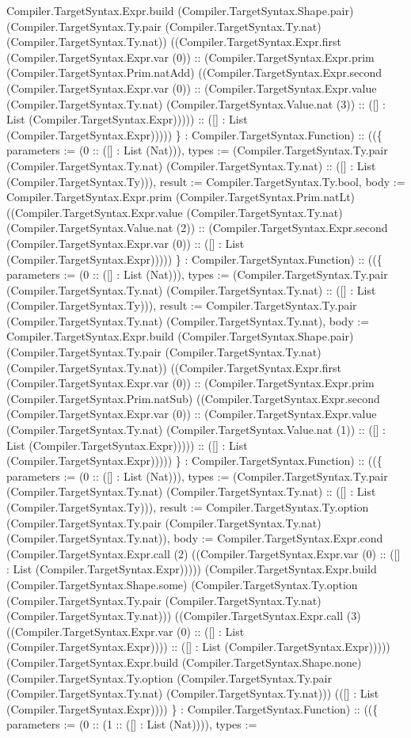 \documentclass[11pt]{article}
\begin{document}
Compiler.TargetSyntax.Expr.build (Compiler.TargetSyntax.Shape.pair) (Compiler.TargetSyntax.Ty.pair (Compiler.TargetSyntax.Ty.nat) (Compiler.TargetSyntax.Ty.nat)) ((Compiler.TargetSyntax.Expr.first (Compiler.TargetSyntax.Expr.var (0)) :: (Compiler.TargetSyntax.Expr.prim (Compiler.TargetSyntax.Prim.natAdd) ((Compiler.TargetSyntax.Expr.second (Compiler.TargetSyntax.Expr.var (0)) :: (Compiler.TargetSyntax.Expr.value (Compiler.TargetSyntax.Ty.nat) (Compiler.TargetSyntax.Value.nat (3)) :: ([] : List (Compiler.TargetSyntax.Expr))))) :: ([] : List (Compiler.TargetSyntax.Expr))))) \} : Compiler.TargetSyntax.Function) :: ((\{ parameters := (0 :: ([] : List (Nat))), types := (Compiler.TargetSyntax.Ty.pair (Compiler.TargetSyntax.Ty.nat) (Compiler.TargetSyntax.Ty.nat) :: ([] : List (Compiler.TargetSyntax.Ty))), result := Compiler.TargetSyntax.Ty.bool, body := Compiler.TargetSyntax.Expr.prim (Compiler.TargetSyntax.Prim.natLt) ((Compiler.TargetSyntax.Expr.value (Compiler.TargetSyntax.Ty.nat) (Compiler.TargetSyntax.Value.nat (2)) :: (Compiler.TargetSyntax.Expr.second (Compiler.TargetSyntax.Expr.var (0)) :: ([] : List (Compiler.TargetSyntax.Expr))))) \} : Compiler.TargetSyntax.Function) :: ((\{ parameters := (0 :: ([] : List (Nat))), types := (Compiler.TargetSyntax.Ty.pair (Compiler.TargetSyntax.Ty.nat) (Compiler.TargetSyntax.Ty.nat) :: ([] : List (Compiler.TargetSyntax.Ty))), result := Compiler.TargetSyntax.Ty.pair (Compiler.TargetSyntax.Ty.nat) (Compiler.TargetSyntax.Ty.nat), body := Compiler.TargetSyntax.Expr.build (Compiler.TargetSyntax.Shape.pair) (Compiler.TargetSyntax.Ty.pair (Compiler.TargetSyntax.Ty.nat) (Compiler.TargetSyntax.Ty.nat)) ((Compiler.TargetSyntax.Expr.first (Compiler.TargetSyntax.Expr.var (0)) :: (Compiler.TargetSyntax.Expr.prim (Compiler.TargetSyntax.Prim.natSub) ((Compiler.TargetSyntax.Expr.second (Compiler.TargetSyntax.Expr.var (0)) :: (Compiler.TargetSyntax.Expr.value (Compiler.TargetSyntax.Ty.nat) (Compiler.TargetSyntax.Value.nat (1)) :: ([] : List (Compiler.TargetSyntax.Expr))))) :: ([] : List (Compiler.TargetSyntax.Expr))))) \} : Compiler.TargetSyntax.Function) :: ((\{ parameters := (0 :: ([] : List (Nat))), types := (Compiler.TargetSyntax.Ty.pair (Compiler.TargetSyntax.Ty.nat) (Compiler.TargetSyntax.Ty.nat) :: ([] : List (Compiler.TargetSyntax.Ty))), result := Compiler.TargetSyntax.Ty.option (Compiler.TargetSyntax.Ty.pair (Compiler.TargetSyntax.Ty.nat) (Compiler.TargetSyntax.Ty.nat)), body := Compiler.TargetSyntax.Expr.cond (Compiler.TargetSyntax.Expr.call (2) ((Compiler.TargetSyntax.Expr.var (0) :: ([] : List (Compiler.TargetSyntax.Expr))))) (Compiler.TargetSyntax.Expr.build (Compiler.TargetSyntax.Shape.some) (Compiler.TargetSyntax.Ty.option (Compiler.TargetSyntax.Ty.pair (Compiler.TargetSyntax.Ty.nat) (Compiler.TargetSyntax.Ty.nat))) ((Compiler.TargetSyntax.Expr.call (3) ((Compiler.TargetSyntax.Expr.var (0) :: ([] : List (Compiler.TargetSyntax.Expr)))) :: ([] : List (Compiler.TargetSyntax.Expr))))) (Compiler.TargetSyntax.Expr.build (Compiler.TargetSyntax.Shape.none) (Compiler.TargetSyntax.Ty.option (Compiler.TargetSyntax.Ty.pair (Compiler.TargetSyntax.Ty.nat) (Compiler.TargetSyntax.Ty.nat))) (([] : List (Compiler.TargetSyntax.Expr)))) \} : Compiler.TargetSyntax.Function) :: ((\{ parameters := (0 :: (1 :: ([] : List (Nat)))), types := 
\end{document}
